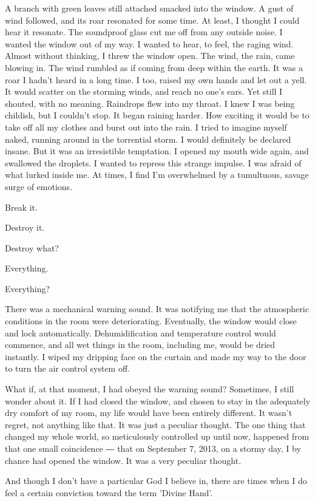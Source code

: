 A branch with green leaves still attached smacked into the window. A
gust of wind followed, and its roar resonated for some time. At least, I
thought I could hear it resonate. The soundproof glass cut me off from
any outside noise. I wanted the window out of my way. I wanted to hear,
to feel, the raging wind. Almost without thinking, I threw the window
open. The wind, the rain, came blowing in. The wind rumbled as if coming
from deep within the earth. It was a roar I hadn't heard in a long time.
I too, raised my own hands and let out a yell. It would scatter on the
storming winds, and reach no one's ears. Yet still I shouted, with no
meaning. Raindrops flew into my throat. I knew I was being childish, but
I couldn't stop. It began raining harder. How exciting it would be to
take off all my clothes and burst out into the rain. I tried to imagine
myself naked, running around in the torrential storm. I would definitely
be declared insane. But it was an irresistible temptation. I opened my
mouth wide again, and swallowed the droplets. I wanted to repress this
strange impulse. I was afraid of what lurked inside me. At times, I find
I'm overwhelmed by a tumultuous, savage surge of emotions.

Break it.

Destroy it.

Destroy what?

Everything.

Everything?

There was a mechanical warning sound. It was notifying me that the
atmospheric conditions in the room were deteriorating. Eventually, the
window would close and lock automatically. Dehumidification and
temperature control would commence, and all wet things in the room,
including me, would be dried instantly. I wiped my dripping face on the
curtain and made my way to the door to turn the air control system off.

What if, at that moment, I had obeyed the warning sound? Sometimes, I
still wonder about it. If I had closed the window, and chosen to stay in
the adequately dry comfort of my room, my life would have been entirely
different. It wasn't regret, not anything like that. It was just a
peculiar thought. The one thing that changed my whole world, so
meticulously controlled up until now, happened from that one small
coincidence ― that on September 7, 2013, on a stormy day, I by chance
had opened the window. It was a very peculiar thought.

And though I don't have a particular God I believe in, there are times
when I do feel a certain conviction toward the term 'Divine Hand'.


